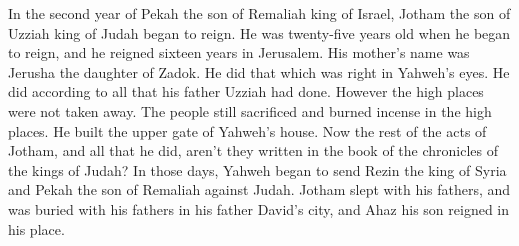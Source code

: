 {\par }{\PP {}In the second year of Pekah the son of Remaliah king of Israel, Jotham the son of Uzziah king of Judah began to reign.
He was twenty-five years old when he began to reign, and he reigned sixteen years in Jerusalem. His mother’s name was Jerusha the daughter of Zadok.
He did that which was right in Yahweh’s eyes. He did according to all that his father Uzziah had done.
However the high places were not taken away. The people still sacrificed and burned incense in the high places. He built the upper gate of Yahweh’s house.
Now the rest of the acts of Jotham, and all that he did, aren’t they written in the book of the chronicles of the kings of Judah?
In those days, Yahweh began to send Rezin the king of Syria and Pekah the son of Remaliah against Judah.
Jotham slept with his fathers, and was buried with his fathers in his father David’s city, and Ahaz his son reigned in his place.

}
